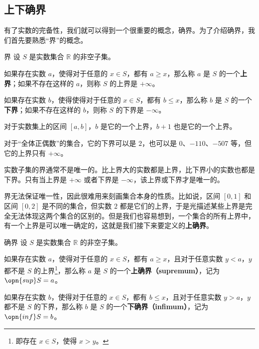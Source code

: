 
\begin{issues}
\issueDraft
\issueTODO
\end{issues}



\subsection{上下确界}

有了实数的完备性，我们就可以得到一个很重要的概念，确界。为了介绍确界，我们首先要熟悉“界”的概念。

\begin{definition}{界}\label{def_SupInf_1}
设 $S$ 是实数集合 $\mathbb{R}$ 的非空子集。

如果存在实数 $a$，使得对于任意的 $x\in S$，都有 $a\geq x$，那么称 $a$ 是 $S$ 的一个\textbf{上界}；如果不存在这样的 $a$，则称 $S$ 的上界是 $+\infty$。

如果存在实数 $b$，使得使得对于任意的 $x\in S$，都有 $b\leq x$，那么称 $b$ 是 $S$ 的一个\textbf{下界}；如果不存在这样的 $b$，则称 $S$ 的下界是 $-\infty$。
\end{definition}

\begin{example}{}
对于实数集上的区间 $[a, b]$，$b$ 是它的一个上界，$b+1$ 也是它的一个上界。

对于“全体正偶数”的集合，它的下界可以是 $2$，也可以是 $0$、$-110$、$-507$ 等，但它的上界只有 $+\infty$。
\end{example}

实数子集的界通常不是唯一的。比上界大的实数都是上界，比下界小的实数也都是下界。只有当上界是 $+\infty$ 或者下界是 $-\infty$，该上界或下界才是唯一的。

界无法保证唯一性，因此很难用来刻画集合本身的性质。比如说，区间 $[0, 1]$ 和区间 $[0, 2]$ 是不同的集合，但实数 $2$ 都是它们的上界，于是光描述某些上界是完全无法体现这两个集合的区别的。但是我们也容易想到，一个集合的所有上界中，有一个上界是可以唯一确定的，这就是我们接下来要定义的\textbf{上确界}。

\begin{definition}{确界}\label{def_SupInf_2}
设 $S$ 是实数集合 $\mathbb{R}$ 的非空子集。

如果存在实数 $a$，使得对于任意的 $x\in S$，都有 $a\geq x$，且对于任意实数 $y<a$，$y$ 都不是 $S$ 的上界\footnote{即存在 $x\in S$，使得 $x>y$。}，那么称 $a$ 是 $S$ 的一个\textbf{上确界（supremum）}，记为 $\opn{sup} S=a$。

如果存在实数 $b$，使得对于任意的 $x\in S$，都有 $b\leq x$，且对于任意实数 $y>a$，$y$ 都不是 $S$ 的下界，那么称 $b$ 是 $S$ 的一个\textbf{下确界（infimum）}，记为 $\opn{inf} S=b$。



\end{definition}


